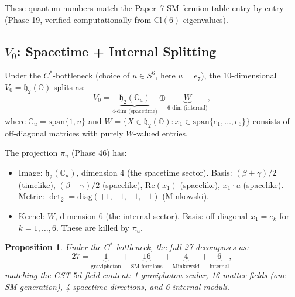 \documentclass[11pt]{article}
\newtheorem{proposition}[theorem]{Proposition}
\begin{document}
These quantum numbers match the Paper~7 SM fermion table entry-by-entry
(Phase 19, verified computationally from $\mathrm{Cl}(6)$ eigenvalues).

\subsection{$V_0$: Spacetime + Internal Splitting}

Under the $C^*$-bottleneck (choice of $u \in S^6$, here $u = e_7$), the
10-dimensional $V_0 = \mathfrak{h}_2(\mathbb{O})$ splits as:
\[
V_0 = \underbrace{\mathfrak{h}_2(\mathbb{C}_u)}_{4\text{-dim (spacetime)}}
\oplus \underbrace{W}_{6\text{-dim (internal)}},
\]
where $\mathbb{C}_u = \mathrm{span}\{1, u\}$ and
$W = \{X \in \mathfrak{h}_2(\mathbb{O}) : x_1 \in \mathrm{span}\{e_1, \ldots, e_6\}\}$
consists of off-diagonal matrices with purely $W$-valued entries.

The projection $\pi_u$ (Phase 46) has:
\begin{itemize}
\item Image: $\mathfrak{h}_2(\mathbb{C}_u)$, dimension 4 (the spacetime sector).
  Basis: $(\beta{+}\gamma)/2$ (timelike), $(\beta{-}\gamma)/2$ (spacelike),
  $\mathrm{Re}(x_1)$ (spacelike), $x_1 \cdot u$ (spacelike).
  Metric: $\det_2 = \mathrm{diag}(+1,-1,-1,-1)$ (Minkowski).
\item Kernel: $W$, dimension 6 (the internal sector).
  Basis: off-diagonal $x_1 = e_k$ for $k = 1, \ldots, 6$.
  These are killed by $\pi_u$.
\end{itemize}

\begin{proposition}
Under the $C^*$-bottleneck, the full 27 decomposes as:
\[
27 = \underbrace{1}_{\text{graviphoton}} + \underbrace{16}_{\text{SM fermions}}
+ \underbrace{4}_{\text{Minkowski}} + \underbrace{6}_{\text{internal}},
\]
matching the GST $5d$ field content: 1 graviphoton scalar, 16 matter fields
(one SM generation), 4 spacetime directions, and 6 internal moduli.
\end{proposition}
\end{document}
